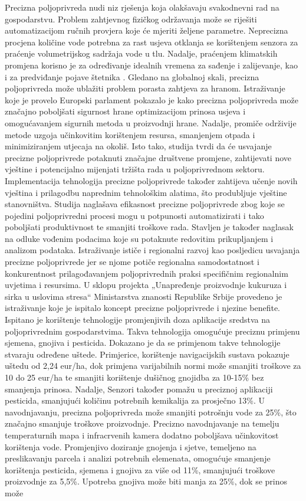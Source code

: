 Precizna poljoprivreda nudi niz rješenja koja olakšavaju svakodnevni rad na gospodarstvu. Problem zahtjevnog fizičkog održavanja može se riješiti automatizacijom ručnih provjera koje će mjeriti željene parametre. Neprecizna procjena količine vode potrebna za rast usjeva otklanja se korištenjem senzora za praćenje volumetrijskog sadržaja vode u tlu. Nadalje, praćenjem klimatskih promjena korisno je za određivanje idealnih vremena za sađenje i zalijevanje, kao i za predviđanje pojave štetnika \cite{iotnet_usecase}. Gledano na globalnoj skali, precizna poljoprivreda može ublažiti problem porasta zahtjeva za hranom. Istraživanje koje je provelo Europski parlament \cite{eu_study} pokazalo je kako precizna poljoprivreda može značajno poboljšati sigurnost hrane optimizacijom prinosa usjeva i omogućavanjem sigurnih metoda u proizvodnji hrane. Nadalje, promiče održivije metode uzgoja učinkovitim korištenjem resursa, smanjenjem otpada i minimiziranjem utjecaja na okoliš. Isto tako, studija tvrdi da će usvajanje precizne poljoprivrede potaknuti značajne društvene promjene, zahtijevati nove vještine i potencijalno mijenjati tržišta rada u poljoprivrednom sektoru. Implementacija tehnologija precizne poljoprivrede također zahtijeva učenje novih vještina i prilagodbu naprednim tehnološkim alatima, što produbljuje vještine stanovništva. Studija naglašava efikasnost precizne poljoprivrede zbog koje se pojedini poljoprivredni procesi mogu u potpunosti automatizirati i tako poboljšati produktivnost te smanjiti troškove rada. Stavljen je također naglasak na odluke vođenim podacima  koje su potaknute redovitim prikupljanjem i analizom podataka. Istraživanje ističe i regionalni razvoj kao posljedicu usvajanja precizne poljoprivrede jer se njome potiče regionalna samodostatnost i konkurentnost prilagođavanjem poljoprivrednih praksi specifičnim regionalnim uvjetima i resursima. U sklopu projekta „Unapređenje proizvodnje kukuruza i sirka u uslovima stresa“ Ministarstva znanosti Republike Srbije provedeno je istraživanje \cite{srbija_study} koje je ispitalo koncept precizne poljoprivrede i njezine benefite. Ispitano je korištenje tehnologije promjenjivih doza aplikacije sredstva  na poljoprivrednim gospodarstvima. Takva tehnologija omogućuje preciznu primjenu sjemena, gnojiva i pesticida. Dokazano je da se primjenom takve tehnologije stvaraju određene uštede. Primjerice, korištenje navigacijskih sustava pokazuje uštedu od 2,24 eur/ha, dok primjena varijabilnih normi može smanjiti troškove za 10 do 25 eur/ha te smanjiti korištenje dušičnog gnojidba za 10-15\% bez smanjenja prinosa. Nadalje, Senzori također pomažu u preciznoj aplikaciji pesticida, smanjujući količinu potrebnih kemikalija za prosječno 13\%. U navodnjavanju, precizna poljoprivreda može smanjiti potrošnju vode za 25\%, što značajno smanjuje troškove proizvodnje. Precizno navodnjavanje na temelju temperaturnih mapa i infracrvenih kamera dodatno poboljšava učinkovitost korištenja vode. Promjenjivo doziranje gnojenja i sjetve, temeljeno na preslikavanju parcela i analizi potrebnih elemenata, omogućuje smanjenje korištenja pesticida, sjemena i gnojiva za više od 11\%, smanjujući troškove proizvodnje za 5,5\%. Upotreba gnojiva može biti manja za 25\%, dok se prinos može 